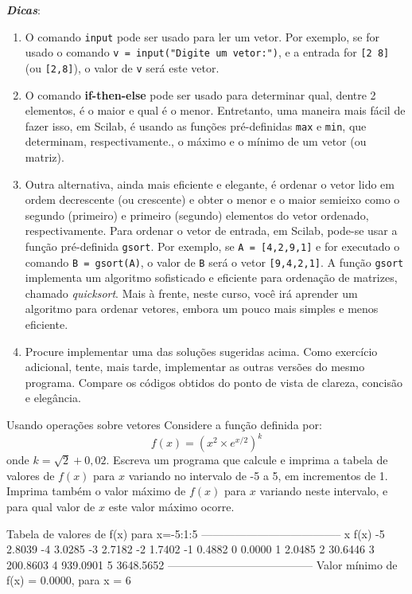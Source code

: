 \documentclass[11pt,fleqn]{practice}
\begin{document}
\textbf{\emph{Dicas}}:
\begin{enumerate}
     \item O comando \texttt{input} pode ser usado para ler um vetor. Por exemplo, se for usado o comando \mbox{\texttt{v = input("Digite um vetor:")}}, e a entrada for \texttt{[2 8]} (ou \texttt{[2,8]}), o valor de \texttt{v} será este vetor. 
     \item O comando \textbf{if-then-else} pode ser usado para determinar qual, dentre 2 elementos, é o maior e qual é o menor. Entretanto, uma maneira mais fácil de fazer isso, em Scilab, é usando as funções pré-definidas \texttt{max} e \texttt{min}, que determinam, respectivamente., o máximo e o mínimo de um vetor (ou matriz). 
    \item Outra alternativa, ainda mais eficiente e elegante, é ordenar o vetor lido em ordem decrescente (ou crescente) e obter o menor e o maior semieixo como o segundo (primeiro) e primeiro (segundo) elementos do vetor ordenado, respectivamente. Para ordenar o vetor de entrada, em Scilab, pode-se usar a função pré-definida \texttt{gsort}. Por exemplo, se \mbox{\texttt{A = [4,2,9,1]}} e for executado o comando \mbox{\texttt{B = gsort(A)}}, o valor de \texttt{B} será o vetor \texttt{[9,4,2,1]}. A função \texttt{gsort} implementa um algoritmo sofisticado e eficiente para ordenação de matrizes, chamado \emph{quicksort}. Mais à frente, neste curso, você irá aprender um algoritmo para ordenar vetores, embora um pouco mais simples e menos eficiente. 
   \item Procure implementar uma das soluções sugeridas acima. Como exercício adicional, tente, mais tarde, implementar as outras versões do mesmo programa. Compare os códigos obtidos do ponto de vista de clareza, concisão e elegância.  
\end{enumerate}


\begin{task}{Usando operações sobre vetores}{}
Considere a função definida por:
\[ f(x) = (x^2 \times e^{x/2})^{k} \]
onde $k=\sqrt{2}+0,02$. Escreva um programa que calcule e imprima a tabela de valores de $f(x)$ para $x$ variando no intervalo de -5 a 5, em incrementos de 1. Imprima também o valor máximo de $f(x)$ para $x$ variando neste intervalo, e para qual valor de $x$ este valor máximo ocorre.

  \begin{runexample}
 Tabela de valores de f(x) para x=-5:1:5
--------------------------------------
 x       f(x)
-5      2.8039 
-4      3.0285 
-3      2.7182 
-2      1.7402 
-1      0.4882 
 0      0.0000 
 1      2.0485 
 2     30.6446 
 3    200.8603 
 4    939.0901 
 5   3648.5652 
---------------------------------------
Valor mínimo de f(x) =    0.0000, para x =  6 
\end{runexample}

 \tcblower
  \solution
\end{task}
\end{document}
